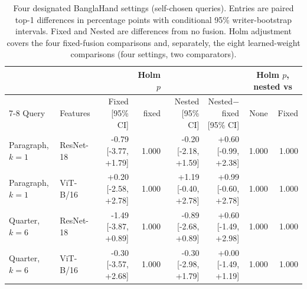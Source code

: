\begin{table}[ht]
\caption{Four designated BanglaHand settings (self-chosen queries). Entries are paired top-1 differences in percentage points with conditional 95\% writer-bootstrap intervals. Fixed and Nested are differences from no fusion. Holm adjustment covers the four fixed-fusion comparisons and, separately, the eight learned-weight comparisons (four settings, two comparators).}\label{tab:designated}
\centering\footnotesize\setlength{\tabcolsep}{2.2pt}
\begin{tabular}{llrrrrrr}\toprule
 & & & Holm $p$ & & & \multicolumn{2}{c}{Holm $p$, nested vs}\\\cmidrule(lr){7-8}
Query & Features & Fixed [95\% CI] & fixed & Nested [95\% CI] & Nested$-$fixed [95\% CI] & None & Fixed\\\midrule
Paragraph, $k=1$ & ResNet-18 & -0.79 [-3.77, +1.79] & 1.000 & -0.20 [-2.18, +1.59] & +0.60 [-0.99, +2.38] & 1.000 & 1.000 \\
Paragraph, $k=1$ & ViT-B/16 & +0.20 [-2.58, +2.78] & 1.000 & +1.19 [-0.40, +2.78] & +0.99 [-0.60, +2.78] & 1.000 & 1.000 \\
Quarter, $k=6$ & ResNet-18 & -1.49 [-3.87, +0.89] & 1.000 & -0.89 [-2.68, +0.89] & +0.60 [-1.49, +2.98] & 1.000 & 1.000 \\
Quarter, $k=6$ & ViT-B/16 & -0.30 [-3.57, +2.68] & 1.000 & -0.30 [-2.98, +1.79] & +0.00 [-1.49, +1.19] & 1.000 & 1.000 \\
\bottomrule
\end{tabular}
\end{table}
